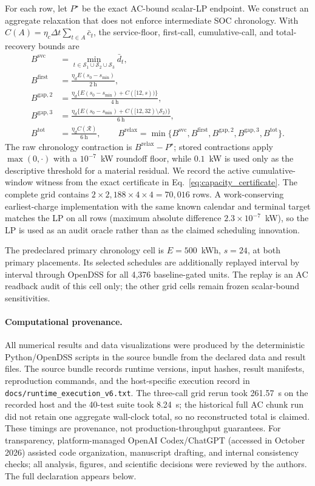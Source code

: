 \documentclass[11pt]{article}
\begin{document}
For each row, let \(P^\star\) be the exact AC-bound scalar-LP endpoint. We construct an aggregate relaxation that does not enforce intermediate SOC chronology. With \(C(A)=\eta_c\Delta t\sum_{t\in A}\bar c_t\), the service-floor, first-call, cumulative-call, and total-recovery bounds are
\begin{align}
B^{\mathrm{svc}}&=\min_{t\in\mathcal S_1\cup\mathcal S_2\cup\mathcal S_3}\bar d_t,\\
B^{\mathrm{first}}&=\frac{\eta_d E(s_0-s_{\min})}{2~\mathrm{h}},\\
B^{\mathrm{gap},2}&=\frac{\eta_d\{E(s_0-s_{\min})+C([12,s))\}}{4~\mathrm{h}},\\
B^{\mathrm{gap},3}&=\frac{\eta_d\{E(s_0-s_{\min})+C([12,32)\setminus\mathcal S_2)\}}{6~\mathrm{h}},\\
B^{\mathrm{tot}}&=\frac{\eta_d C(\mathcal R)}{6~\mathrm{h}},\qquad
B^{\mathrm{relax}}=\min\{B^{\mathrm{svc}},B^{\mathrm{first}},B^{\mathrm{gap},2},
B^{\mathrm{gap},3},B^{\mathrm{tot}}\}.
\end{align}
The raw chronology contraction is \(B^{\mathrm{relax}}-P^\star\); stored contractions apply \(\max(0,\cdot)\) with a \(10^{-7}\)~kW roundoff floor, while \(0.1\)~kW is used only as the descriptive threshold for a material residual. We record the active cumulative-window witness from the exact certificate in Eq.~\eqref{eq:capacity_certificate}. The complete grid contains \(2\times2{,}188\times4\times4=70{,}016\) rows. A work-conserving earliest-charge implementation with the same known calendar and terminal target matches the LP on all rows (maximum absolute difference \(2.3\times10^{-7}\)~kW), so the LP is used as an audit oracle rather than as the claimed scheduling innovation.

The predeclared primary chronology cell is \(E=500\)~kWh, \(s=24\), at both primary placements. Its selected schedules are additionally replayed interval by interval through OpenDSS for all 4,376 baseline-gated units. The replay is an AC readback audit of this cell only; the other grid cells remain frozen scalar-bound sensitivities.

\paragraph{Computational provenance.} All numerical results and data visualizations were produced by the deterministic Python/OpenDSS scripts in the source bundle from the declared data and result files. The source bundle records runtime versions, input hashes, result manifests, reproduction commands, and the host-specific execution record in \texttt{docs/runtime\_execution\_v6.txt}. The three-call grid rerun took 261.57~s on the recorded host and the 40-test suite took 8.24~s; the historical full AC chunk run did not retain one aggregate wall-clock total, so no reconstructed total is claimed. These timings are provenance, not production-throughput guarantees. For transparency, platform-managed OpenAI Codex/ChatGPT (accessed in October 2026) assisted code organization, manuscript drafting, and internal consistency checks; all analysis, figures, and scientific decisions were reviewed by the authors. The full declaration appears below.
\end{document}

